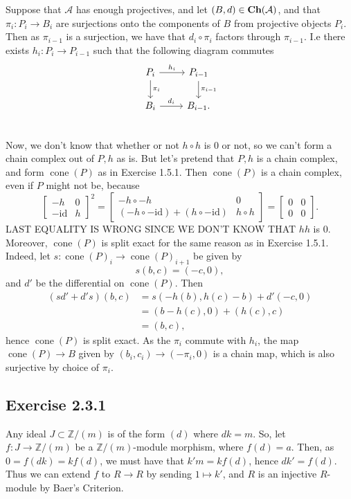\documentclass{article}
\theoremstyle{definition}
\newcommand{\Z}{\mathbb{Z}}
\DeclareMathOperator{\cone}{cone}
\newcommand{\id}{\text{id}}
\newcommand{\catname}[1]{{\normalfont\textbf{#1}}}
\newcommand{\Ch}{\catname{Ch}}
\begin{document}
Suppose that $\mathcal{A}$ has enough projectives, and let $(B, d) \in
\Ch(\mathcal{A})$, and that $\pi_i : P_i \to B_i$ are surjections onto the
components of $B$ from projective objects $P_i$. Then as $\pi_{i - 1}$ is a
surjection, we have that $d_i \circ \pi_i$ factors through $\pi_{i - 1}$. I.e
there exists $h_i : P_i \to P_{i - 1}$ such that the following diagram commutes
\[
	\begin{tikzcd}
		P_i \arrow[d, "\pi_i"] \arrow[r, "h_i"] & P_{i-1} \arrow[d, "\pi_{i-1}"] \\
		B_i \arrow[r, "d_i"] & B_{i-1}. \\
	\end{tikzcd}
\]
Now, we don't know that whether or not $h \circ h$ is $0$ or not, so we can't
form a chain complex out of $P, h$ as is. But let's pretend that $P, h$ is a
chain complex, and form $\cone(P)$ as in Exercise 1.5.1. Then $\cone(P)$ is a
chain complex, even if $P$ might not be, because 
\[
	\begin{bmatrix}
		-h & 0 \\
		-\id & h
	\end{bmatrix}^2
	=
	\begin{bmatrix}
		-h \circ - h & 0 \\
		(-h \circ -\id) + (h \circ - \id) & h \circ h
	\end{bmatrix}
	=
	\begin{bmatrix}
		0 & 0 \\
		0 & 0
	\end{bmatrix}.
\] 
LAST EQUALITY IS WRONG SINCE WE DON'T KNOW THAT $hh$ is $0$. Moreover,
$\cone(P)$ is split exact for the same reason as in Exercise 1.5.1. Indeed, let
$s : \cone(P)_i \to \cone(P)_{i + 1}$ be given by 
\[
	s(b, c) = (-c, 0),
\] 
and $d'$ be the differential on $\cone(P)$. Then 
\begin{align*}
	(sd' + d's)(b, c)
	&=
	s(-h(b), h(c) - b) + d'(-c, 0) \\
	&=
	(b - h(c), 0) + (h(c), c) \\
	&=
	(b, c), 
\end{align*} 
hence $\cone(P)$ is split exact. As the $\pi_i$ commute with $h_i$, the map
$\cone(P) \to B$ given by $(b_i, c_i) \to (-\pi_i, 0)$ is a chain map, which is
also surjective by choice of $\pi_i$.

\subsection*{Exercise 2.3.1}

Any ideal $J \subset \Z/(m)$ is of the form $(d)$ where $dk = m$. So, let $f :
J \to \Z/(m)$ be a $\Z/(m)$-module morphism, where $f(d) = a$. Then, as $0 =
f(dk) = kf(d)$, we must have that $k'm = kf(d)$, hence $dk' = f(d)$. Thus we
can extend $f$ to $R \to R$ by sending $1 \mapsto k'$, and $R$ is an injective
$R$-module by Baer's Criterion. \\
\end{document}
